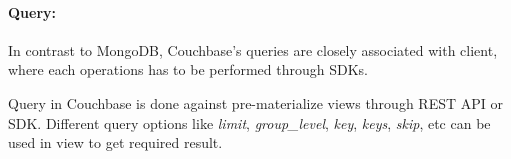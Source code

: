 \par
\paragraph{Query:}
 In contrast to MongoDB,  Couchbase's queries are closely associated with client,  where each operations has to be performed through SDKs.
\par
 Query in Couchbase is done against pre-materialize views through REST API or SDK. Different query options like \textit{limit}, \textit{group\_level}, \textit{key}, \textit{keys}, \textit{skip}, etc can be used in view to get required result. 
 
   
 
 
 
 
 
 
 
 
 
 
 
 
 
 
 
 
 
 
 
 
 
 
 

	